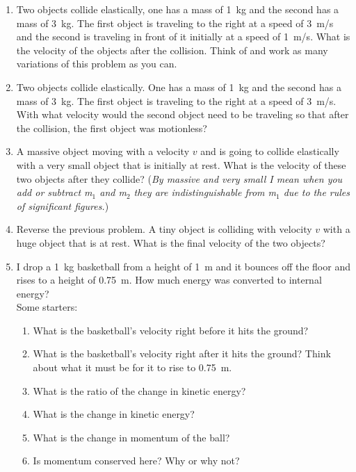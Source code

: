 \begin{enumerate}
\item Two objects collide elastically, one has a mass of \SI{1}{kg} and the second has a mass of \SI{3}{kg}. The first object is traveling to the right at a speed of \SI{3}{m/s} and the second is traveling in front of it initially at a speed of \SI{1}{m/s}. What is the velocity of the objects after the collision. Think of and work as many variations of this problem as you can.
\giantskip

\item Two objects collide elastically. One has a mass of \SI{1}{kg} and the second has a mass of \SI{3}{kg}. The first object is traveling to the right at a speed of \SI{3}{m/s}. With what velocity would the second object need to be traveling so that after the collision, the first object was motionless?


\item
A massive object moving with a velocity $v$ and is going to collide elastically with a very small object that is initially at rest. What is the velocity of these two objects after they collide? (\emph{By massive and very small I mean when you add or subtract m$_1$ and m$_2$ they are indistinguishable from m$_1$ due to the rules of significant figures.})

\item 
Reverse the previous problem. A tiny object is colliding with velocity $v$ with a huge object that is at rest. What is the final velocity of the two objects?

\item 
I drop a \SI{1}{kg} basketball from a height of \SI{1}{\meter} and it bounces off the floor and rises to a height of \SI{0.75}{\meter}. How much energy was converted to internal energy?\\
Some starters:
\begin{enumerate}
	\item What is the basketball's velocity right before it hits the ground?
	\item What is the basketball's velocity right after it hits the ground? Think about what it must be for it to rise to \SI{0.75}{\meter}.
	\item What is the ratio of the change in kinetic energy?
	\item What is the change in kinetic energy?
	\item What is the change in momentum of the ball?
	\item Is momentum conserved here? Why or why not?
\end{enumerate}


\end{enumerate}
